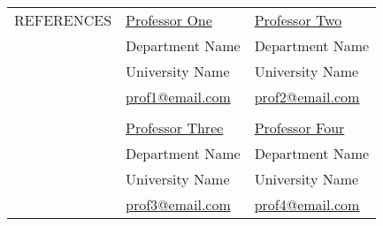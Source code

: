\documentclass[letterpaper, 10pt, oneside]{article}
\begin{document}
\newpage


\noindent \begin{tabular}{@{} l l l}
    \normalsize{R}\footnotesize{EFERENCES} & \href{http://www.professorone.com}{Professor One} & \href{http://www.professortwo.com}{Professor Two} \\
    & Department Name &  Department Name \\
    & University Name &  University Name \\
    & \small{\href{mailto:prof1@email.com}{prof1@email.com}} & \small{\href{mailto:prof2@email.com}{prof2@email.com}} \\
    && \\
    & \href{http://www.professorthree.com}{Professor Three} & \href{http://www.professorfour.com}{Professor Four}  \\
    & Department Name &  Department Name \\
    & University Name &  University Name \\
    & \small{\href{mailto:prof3@email.com}{prof3@email.com}} & \small{\href{mailto:prof4@email.com}{prof4@email.com}} \\
\end{tabular}
\end{document}
